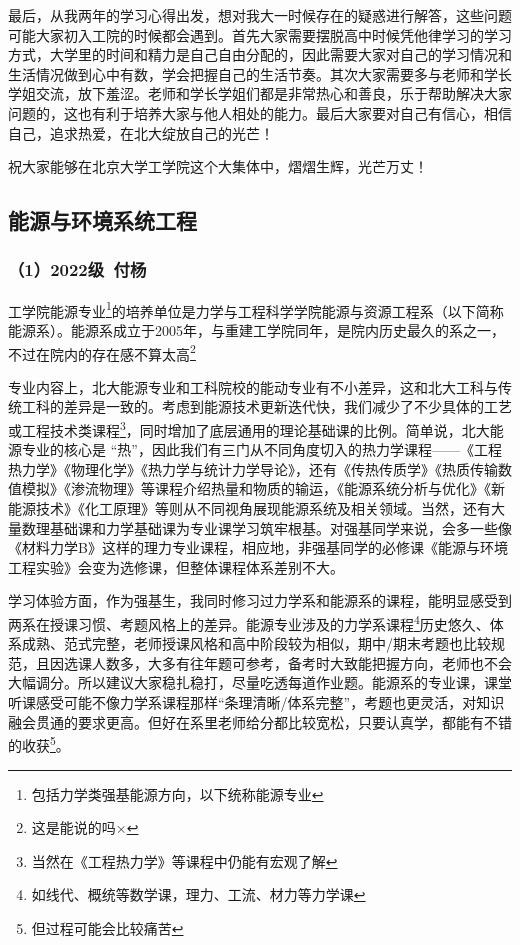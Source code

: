 \documentclass[11pt,oneside]{book}
\begin{document}
\vspace{10pt}

最后，从我两年的学习心得出发，想对我大一时候存在的疑惑进行解答，这些问题可能大家初入工院的时候都会遇到。首先大家需要摆脱高中时候凭他律学习的学习方式，大学里的时间和精力是自己自由分配的，因此需要大家对自己的学习情况和生活情况做到心中有数，学会把握自己的生活节奏。其次大家需要多与老师和学长学姐交流，放下羞涩。老师和学长学姐们都是非常热心和善良，乐于帮助解决大家问题的，这也有利于培养大家与他人相处的能力。最后大家要对自己有信心，相信自己，追求热爱，在北大绽放自己的光芒！

\vspace{10pt}

祝大家能够在北京大学工学院这个大集体中，熠熠生辉，光芒万丈！

\subsection{能源与环境系统工程}
\subsubsection{（1）2022级\ 付杨}

工学院能源专业\footnote{包括力学类强基能源方向，以下统称能源专业}的培养单位是力学与工程科学学院能源与资源工程系（以下简称能源系）。能源系成立于2005年，与重建工学院同年，是院内历史最久的系之一，不过在院内的存在感不算太高\footnote{这是能说的吗×}

专业内容上，北大能源专业和工科院校的能动专业有不小差异，这和北大工科与传统工科的差异是一致的。考虑到能源技术更新迭代快，我们减少了不少具体的工艺或工程技术类课程\footnote{当然在《工程热力学》等课程中仍能有宏观了解}，同时增加了底层通用的理论基础课的比例。简单说，北大能源专业的核心是 “热”，因此我们有三门从不同角度切入的热力学课程——《工程热力学》《物理化学》《热力学与统计力学导论》，还有《传热传质学》《热质传输数值模拟》《渗流物理》等课程介绍热量和物质的输运，《能源系统分析与优化》《新能源技术》《化工原理》等则从不同视角展现能源系统及相关领域。当然，还有大量数理基础课和力学基础课为专业课学习筑牢根基。对强基同学来说，会多一些像《材料力学B》这样的理力专业课程，相应地，非强基同学的必修课《能源与环境工程实验》会变为选修课，但整体课程体系差别不大。

\vspace{10pt}

学习体验方面，作为强基生，我同时修习过力学系和能源系的课程，能明显感受到两系在授课习惯、考题风格上的差异。能源专业涉及的力学系课程\footnote{如线代、概统等数学课，理力、工流、材力等力学课}历史悠久、体系成熟、范式完整，老师授课风格和高中阶段较为相似，期中/期末考题也比较规范，且因选课人数多，大多有往年题可参考，备考时大致能把握方向，老师也不会大幅调分。所以建议大家稳扎稳打，尽量吃透每道作业题。能源系的专业课，课堂听课感受可能不像力学系课程那样“条理清晰/体系完整”，考题也更灵活，对知识融会贯通的要求更高。但好在系里老师给分都比较宽松，只要认真学，都能有不错的收获\footnote{但过程可能会比较痛苦}。
\end{document}
